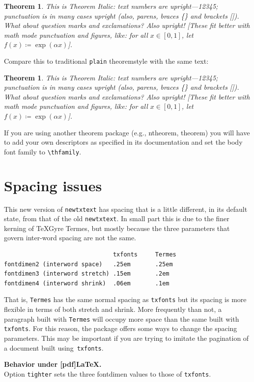 \documentclass[\fsc]{article}
\theoremstyle{oldplain}
\newtheorem{oldthm}{Theorem}[section]
\theoremstyle{plain}
\newtheorem{thm}{Theorem}[section]
\begin{document}
\begin{thm}
This is Theorem Italic:
text numbers are upright---12345; punctuation is in many cases upright (also, parens, braces \{\} and brackets []). What about question marks and exclamations? Also upright! [These fit better with math mode punctuation and figures, like: for all $x\in[0,1]$, let $f(x)\coloneq \exp(\alpha x)$].
\end{thm}
Compare this to traditional {\tt plain} theoremstyle with the same text:
\begin{oldthm}
This is Theorem Italic: text numbers are upright---12345; punctuation is in many cases upright (also, parens, braces \{\} and brackets []). What about question marks and exclamations? Also upright! [These fit better with math mode punctuation and figures, like: for all $x\in[0,1]$, let $f(x)\coloneq \exp(\alpha x)$].
\end{oldthm}

If you are using another theorem package (e.g., ntheorem, theorem) you will have to add your own descriptors as specified in its documentation and set the body font family to \verb|\thfamily|.

\section{Spacing issues}
This new version of {\tt newtxtext} has spacing that is a little different, in its default state, from that of the old {\tt newtxtext}. In small part this is due to the finer kerning of TeXGyre Termes, but mostly because the three parameters that govern inter-word spacing are not the same.
\begin{verbatim}
                               txfonts     Termes
fontdimen2 (interword space)   .25em       .25em
fontdimen3 (interword stretch) .15em       .2em
fontdimen4 (interword shrink)  .06em       .1em
\end{verbatim}
That is, {\tt Termes} has the same normal spacing as {\tt txfonts} but its spacing is more flexible in terms of both stretch and shrink. More frequently than not, a paragraph built with {\tt Termes} will occupy more space than the same built with {\tt txfonts}. For this reason, the package offers some ways to change the spacing parameters. This may be important if you are trying to imitate the pagination of a document built using~{\tt txfonts}.

\textbf{Behavior under [pdf]LaTeX.}\\
Option {\tt tighter} sets the three fontdimen values to those of {\tt txfonts}.  
\end{document}
